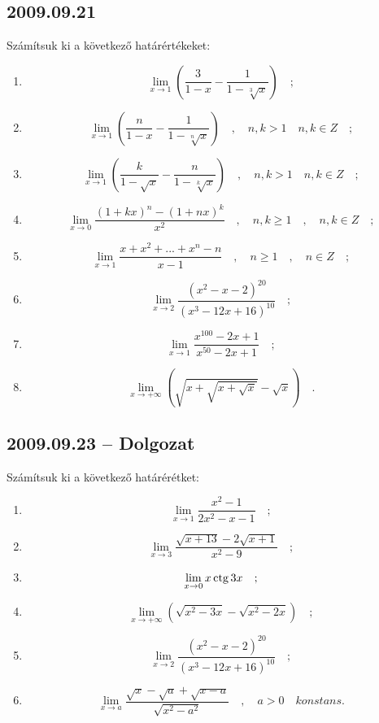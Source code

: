 \subsection*{2009.09.21}
Számítsuk ki a következő határértékeket:
\begin{enumerate}
\item $$\lim_{x\to 1}\left(\frac{3}{1-x}-\frac{1}{1-\sqrt[3]{x}}\right)\quad;$$
\item $$\lim_{x\to 1}\left(\frac{n}{1-x}-\frac{1}{1-\sqrt[n]{x}}\right)\quad,\quad n,k>1\quad n,k\in{Z}\quad;$$
\item $$\lim_{x\to 1}\left(\frac{k}{1-\sqrt{x}}-\frac{n}{1-\sqrt[k]{x}}\right)\quad,\quad n,k>1\quad n,k\in{Z}\quad;$$
\item $$\lim_{x\to 0}\frac{\left(1+kx\right)^n-\left(1+nx\right)^k}{x^2}\quad,\quad n,k\geq 1\quad, \quad n,k\in{Z}\quad;$$
\item $$\lim_{x\to 1}\frac{x+x^2+...+x^n-n}{x-1}\quad,\quad n\geq1\quad,\quad n\in{Z}\quad;$$
\item $$\lim_{x\to 2}\frac{\left(x^2-x-2\right)^{20}}{\left(x^3-12x+16\right)^{10}}\quad;$$
\item $$\lim_{x\to 1}\frac{x^{100}-2x+1}{x^{50}-2x+1}\quad;$$
\item $$\lim_{x\to +\infty}\left(\sqrt{x+\sqrt{x+\sqrt{x}}}-\sqrt{x}\right)\quad.$$
\end{enumerate}
\subsection*{2009.09.23 -- Dolgozat}
Számítsuk ki a következő határérétket:
\begin{enumerate}
\item $$\lim_{x\to 1}\frac{x^2-1}{2x^2-x-1}\quad;$$
\item $$\lim_{x\to 3}\frac{\sqrt{x+13}-2\sqrt{x+1}}{x^2-9}\quad;$$
\item $$\lim_{x\to 0}x\mathop{\mathrm{ctg}}\nolimits 3x\quad;$$
\item $$\lim_{x\to +\infty}\left(\sqrt{x^2-3x}-\sqrt{x^2-2x}\right)\quad;$$
\item $$\lim_{x\to 2}\frac{\left(x^2-x-2\right)^{20}}{\left(x^3-12x+16\right)^{10}}\quad;$$
\item $$\lim_{x\to a}\frac{\sqrt{x}-\sqrt{a}+\sqrt{x-a}}{\sqrt{x^2-a^2}}\quad,\quad a>0\quad konstans.$$
\end{enumerate}

